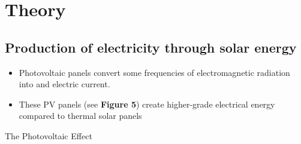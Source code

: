 \documentclass{article}
\begin{document}
    \section{Theory}
    \subsection{Production of electricity through solar energy}
    \begin{itemize}
        \item Photovoltaic panels convert some frequencies of electromagnetic radiation into and electric current.
        \item These PV panels (see \textbf{Figure 5}) create higher-grade electrical energy compared to thermal solar panels
    \end{itemize}
    The Photovoltaic Effect
\end{document}
